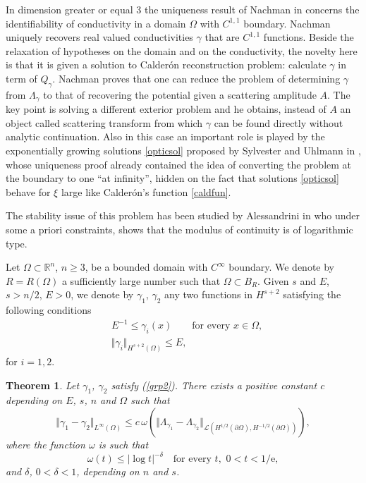 \documentclass[10pt, a4paper, twoside, openright]{book}
\theoremstyle{definition}
\theoremstyle{plain}
\newtheorem{theorem}[subsection]{Theorem}
\theoremstyle{plain}
\theoremstyle{plain}
\theoremstyle{plain}
\theoremstyle{plain}
\theoremstyle{plain}
\theoremstyle{plain}
\theoremstyle{plain}
\begin{document}
In dimension greater or equal 3
the uniqueness result of Nachman in
\cite{Na88} concerns the identifiability of conductivity
in a domain $\Omega$ with $C^{1,1}$ boundary. Nachman uniquely recovers
real valued conductivities $\gamma$ that are $C^{1,1}$ functions.
Beside the relaxation of hypotheses on the domain and on the conductivity,
the novelty here is that it is given a solution to Calder\'on reconstruction problem:
calculate $\gamma$ in term of $Q_{\gamma}$.
Nachman proves that one can reduce the problem of determining $\gamma$
from $\Lambda_{\gamma}$
to that of recovering the potential given a scattering amplitude $A$.
The key point is solving a different exterior problem and
he obtains, instead of $A$ an object called scattering transform from which
$\gamma$ can be found directly without analytic continuation.
Also in this case an important role is played by the exponentially growing
solutions
\eqref{opticsol} proposed by Sylvester and Uhlmann in \cite{Sy-Uh}, whose uniqueness
proof already contained the idea of converting the problem at the boundary
to one ``at infinity'', hidden on the fact that solutions
\eqref{opticsol} behave for $\xi$ large like Calder\'on's function \eqref{caldfun}.

The stability issue of this problem has been studied by Alessandrini in \cite{Al88} who under
some a priori constraints, shows that the modulus of continuity
is of logarithmic type.

Let $\Omega\subset\mathbb{R}^{n}$, $n\geq3$, be a bounded domain with
$C^{\infty}$ boundary.
We denote by $R=R(\Omega)$ a sufficiently large number such that
$\Omega\subset B_{R}$. Given $s$ and $E$, $s>n/2$, $E>0$,
we denote by $\gamma_1$, $\gamma_2$ any two functions in $H^{s+2}$
satisfying the following conditions
\begin{subequations}\label{grp2}
\begin{align}
\label{E}
&E^{-1}\leq\gamma_{i}(x)\qquad\textrm{for every }x\in\Omega,\\[2mm]
\label{gamma3}
&\Vert\gamma_i\Vert_{H^{s+2}(\Omega)}\leq E,
\end{align}
\end{subequations}
for $i=1,2$.
\begin{theorem}
\label{stabcondteo}
Let $\gamma_1$, $\gamma_2$ satisfy (\ref{grp2}).
There exists a positive constant $c$ depending on $E$, $s$, $n$
and $\Omega$ such that
\begin{equation}
\label{stabcond}
\Vert\gamma_1-\gamma_2\Vert_{L^{\infty}(\Omega)}
\leq c\,\omega\left(\Vert\Lambda_{\gamma_1}-\Lambda_{\gamma_2}
\Vert_{\mathcal{L}(H^{1/2}(\partial \Omega),H^{-1/2}(\partial \Omega))} \right),
\end{equation}
where the function $\omega$ is such that
\begin{equation}
\label{omega}
\omega(t)\leq|\log t|^{-\delta}\quad\textrm{for every }t,\,\,0<t<1/\textrm{e},
\end{equation}
and $\delta$, $0<\delta<1$, depending on $n$ and $s$.
\end{theorem}
\end{document}
